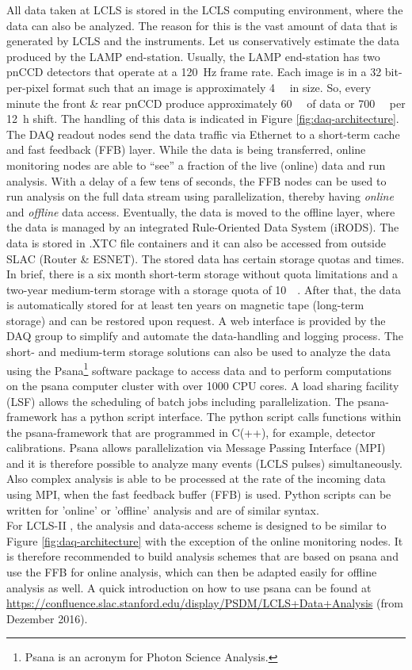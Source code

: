 All data taken at LCLS is stored in the LCLS computing environment, where the data can also be analyzed. The reason for this is the vast amount of data that is generated by LCLS and the instruments. Let us conservatively estimate the data produced by the LAMP end-station. Usually, the LAMP end-station has two pnCCD detectors that operate at a \SI{120}{\hertz} frame rate. Each image is in a 32 bit-per-pixel format such that an image is approximately \SI{4}{\mega\byte} in size. So, every minute the front \& rear pnCCD produce approximately \SI{60}{\giga\byte} of data or \SI{700}{\giga\byte} per \SI{12}{\hour} shift. The handling of this data is indicated in Figure \ref{fig:daq-architecture}. The DAQ readout nodes send the data traffic via Ethernet to a short-term cache and fast feedback (FFB) layer. While the data is being transferred, online monitoring nodes are able to ``see'' a fraction of the live (online) data and run analysis. With a delay of a few tens of seconds, the FFB nodes can be used to run analysis on the full data stream using parallelization, thereby having \textit{online} and \textit{offline} data access. Eventually, the data is moved to the offline layer, where the data is managed by an integrated Rule-Oriented Data System (iRODS). The data is stored in .XTC file containers and it can also be accessed from outside SLAC (Router \& ESNET). The stored data has certain storage quotas and times. In brief, there is a six month short-term storage without quota limitations and a two-year medium-term storage with a storage quota of \SI{10}{\tera\byte}. After that, the data is automatically stored for at least ten years on magnetic tape (long-term storage) and can be restored upon request. A web interface is provided by the DAQ group to simplify and automate the data-handling and logging process. The short- and medium-term storage solutions can also be used to analyze the data using the Psana\footnote{Psana is an acronym for Photon Science Analysis.} software package \citep{Damiani-2016-JSR} to access data and to perform computations on the psana computer cluster with over 1000 CPU cores. A load sharing facility (LSF) allows the scheduling of batch jobs including parallelization. The psana-framework has a python script interface. The python script calls functions within the psana-framework that are programmed in C(++), for example, detector calibrations. Psana allows parallelization via Message Passing Interface (MPI) and it is therefore possible to analyze many events (LCLS pulses) simultaneously. Also complex analysis is able to be processed at the rate of the incoming data using MPI, when the fast feedback buffer (FFB) is used. Python scripts can be written for 'online' or 'offline' analysis and are of similar syntax.\\[1\baselineskip]
%
For LCLS-II \citep{Amadeo-2016-SLAC}, the analysis and data-access scheme is designed to be similar to Figure \ref{fig:daq-architecture} with the exception of the online monitoring nodes. It is therefore recommended to build analysis schemes that are based on psana and use the FFB for online analysis, which can then be adapted easily for offline analysis as well. A quick introduction on how to use psana can be found at \url{https://confluence.slac.stanford.edu/display/PSDM/LCLS+Data+Analysis} (from Dezember 2016).
%
%
%
